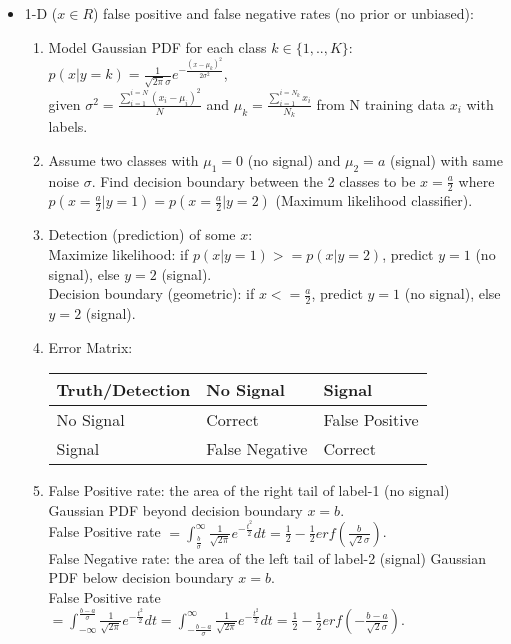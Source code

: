 \documentclass[11pt]{article}
\begin{document}
\begin{itemize}
    \item 1-D ($x \in R$) false positive and false negative rates (no prior or unbiased):
\begin{enumerate}
    \item Model Gaussian PDF for each class $k \in \{1,..,K\}$:
    $p(x|y=k) = \frac{1}{\sqrt{2\pi}\sigma} e^{-\frac{{(x-\mu_k)}^2}{2\sigma^2}}$,\\
    given $\sigma^2=\frac{\sum_{i=1}^{i=N} {(x_i-\mu_i)}^2}{N}$ and $\mu_k = \frac{\sum_{i=1}^{i=N_k} x_i}{N_k}$ from N training data $x_i$ with labels. 
    \item Assume two classes with $\mu_1 = 0$ (no signal) and $\mu_2 = a$ (signal) with same noise $\sigma$. Find decision boundary between the 2 classes to be $x=\frac{a}{2}$ where $p(x=\frac{a}{2}|y=1) = p(x=\frac{a}{2}|y=2)$ (Maximum likelihood classifier).
    \item Detection (prediction) of some $x$: \\
    Maximize likelihood: if $p(x|y=1) >= p(x|y=2)$, predict $y=1$ (no signal), else $y=2$ (signal).\\
    Decision boundary (geometric): if $x <= \frac{a}{2}$, predict $y=1$ (no signal), else $y=2$ (signal).
    \item Error Matrix:
    
    \begin{tabular}{l|l|l}
    Truth/Detection&No Signal&Signal\\\hline
    No Signal&Correct&False Positive\\\hline
    Signal&False Negative&Correct\\
    \end{tabular}
    \item False Positive rate: the area of the right tail of label-1 (no signal) Gaussian PDF beyond decision boundary $x=b$.\\
    False Positive rate $ = \int_{\frac{b}{\sigma}}^{\infty} \frac{1}{\sqrt{2\pi}} e^{-\frac{t^2}{2}}dt = \frac{1}{2} - \frac{1}{2} erf(\frac{b}{\sqrt{2}\sigma})$.\\
    False Negative rate: the area of the left tail of label-2 (signal) Gaussian PDF below decision boundary $x=b$.\\
    False Positive rate $ = \int_{-\infty}^{\frac{b-a}{\sigma}} \frac{1}{\sqrt{2\pi}} e^{-\frac{t^2}{2}}dt = \int_{-\frac{b-a}{\sigma}}^{\infty} \frac{1}{\sqrt{2\pi}} e^{-\frac{t^2}{2}}dt = \frac{1}{2} - \frac{1}{2} erf(-\frac{b-a}{\sqrt{2}\sigma})$.
    

\end{enumerate}
\end{itemize}
\end{document}
